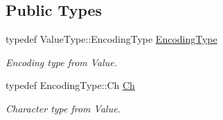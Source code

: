 \subsection*{Public Types}
\begin{DoxyCompactItemize}
\item 
typedef Value\+Type\+::\+Encoding\+Type \hyperlink{class_generic_pointer_a4b802da797a7a0b615fd9611cedb7c3b}{Encoding\+Type}\hypertarget{class_generic_pointer_a4b802da797a7a0b615fd9611cedb7c3b}{}\label{class_generic_pointer_a4b802da797a7a0b615fd9611cedb7c3b}

\begin{DoxyCompactList}\small\item\em Encoding type from Value. \end{DoxyCompactList}\item 
typedef Encoding\+Type\+::\+Ch \hyperlink{class_generic_pointer_a38b73c84d37428340066d907f9d4f37f}{Ch}\hypertarget{class_generic_pointer_a38b73c84d37428340066d907f9d4f37f}{}\label{class_generic_pointer_a38b73c84d37428340066d907f9d4f37f}

\begin{DoxyCompactList}\small\item\em Character type from Value. \end{DoxyCompactList}\end{DoxyCompactItemize}
